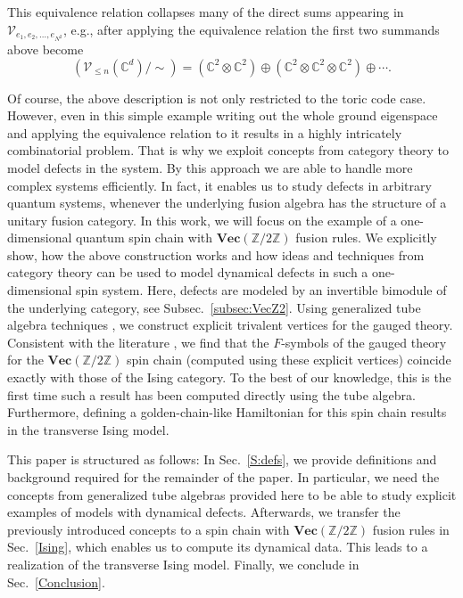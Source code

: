 \documentclass[aps,prb,twocolumn,superscriptaddress,noshowkeys]{revtex4-2}  %
\renewcommand{\Vec}{\textbf{Vec}}
\newcommand{\Z}{\mathbb{Z}}
\theoremstyle{plain}%
\theoremstyle{definition}
\theoremstyle{remark}
\begin{document}
This equivalence relation collapses many of the direct sums appearing in $\mathcal{V}_{e_1,e_2,\ldots,e_{N^2}}$, e.g., after applying the equivalence relation the first two summands above become
\begin{equation}
\left(\mathcal{V}_{\le n}(\mathbb{C}^d)/\sim\right) = (\mathbb{C}^2\otimes \mathbb{C}^2)\oplus (\mathbb{C}^2\otimes \mathbb{C}^2\otimes \mathbb{C}^2)\oplus \cdots.
\end{equation}

Of course, the above description is not only restricted to the toric code case. However, even in this simple example writing out the whole ground eigenspace and applying the equivalence relation to it results in a highly intricately combinatorial problem. That is why we exploit concepts from category theory to model defects in the system. By this approach we are able to handle more complex systems efficiently. In fact, it enables us to study defects in arbitrary quantum systems, whenever the underlying fusion algebra has the structure of a unitary fusion category. In this work, we will focus on the example of a one-dimensional quantum spin chain with $\Vec(\Z/2\Z)$ fusion rules. We explicitly show, how the above construction works and how ideas and techniques from category theory can be used to model dynamical defects in such a one-dimensional spin system. Here, defects are modeled by an invertible bimodule of the underlying category, see Subsec.~\ref{subsec:VecZ2}. Using generalized tube algebra techniques \cite{ocneanu}, we construct explicit trivalent vertices for the gauged theory. Consistent with the literature \cite{TY,ENO10,Bombin2010,BBCW14,WBV17}, we find that the $F$-symbols of the gauged theory for the $\Vec(\Z/2\Z)$ spin chain (computed using these explicit vertices) coincide exactly with those of the Ising category. To the best of our knowledge, this is the first time such a result has been computed directly using the tube algebra. Furthermore, defining a golden-chain-like Hamiltonian \cite{Feiguin2007} for this spin chain results in the transverse Ising model.


This paper is structured as follows: In Sec.~\ref{S:defs}, we provide definitions and background required for the remainder of the paper. In particular, we need the concepts from generalized tube algebras provided here to be able to study explicit examples of models with dynamical defects. Afterwards, we transfer the previously introduced concepts to a spin chain with $\Vec(\Z/2\Z)$ fusion rules in Sec.~\ref{Ising}, which enables us to compute its dynamical data. This leads to a realization of the transverse Ising model. Finally, we conclude in Sec.~\ref{Conclusion}.
\end{document}
